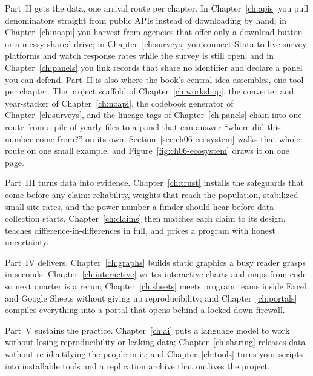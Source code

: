 \documentclass[
    a4paper,
    fontsize=10pt,
    twoside=true,
    numbers=noenddot,
]{kaobook}
\begin{document}
Part~II gets the data, one arrival route per chapter. In Chapter~\ref{ch:apis} you pull denominators straight from public APIs instead of downloading by hand; in Chapter~\ref{ch:noapi} you harvest from agencies that offer only a download button or a messy shared drive; in Chapter~\ref{ch:surveys} you connect Stata to live survey platforms and watch response rates while the survey is still open; and in Chapter~\ref{ch:panels} you link records that share no identifier and declare a panel you can defend. Part~II is also where the book's central idea assembles, one tool per chapter. The project scaffold of Chapter~\ref{ch:workshop}, the converter and year-stacker of Chapter~\ref{ch:noapi}, the codebook generator of Chapter~\ref{ch:surveys}, and the lineage tags of Chapter~\ref{ch:panels} chain into one route from a pile of yearly files to a panel that can answer \enquote{where did this number come from?} on its own. Section~\ref{sec:ch06-ecosystem} walks that whole route on one small example, and Figure~\ref{fig:ch06-ecosystem} draws it on one page.

Part~III turns data into evidence. Chapter~\ref{ch:trust} installs the safeguards that come before any claim: reliability, weights that reach the population, stabilized small-site rates, and the power number a funder should hear before data collection starts. Chapter~\ref{ch:claims} then matches each claim to its design, teaches difference-in-differences in full, and prices a program with honest uncertainty.

Part~IV delivers. Chapter~\ref{ch:graphs} builds static graphics a busy reader grasps in seconds; Chapter~\ref{ch:interactive} writes interactive charts and maps from code so next quarter is a rerun; Chapter~\ref{ch:sheets} meets program teams inside Excel and Google Sheets without giving up reproducibility; and Chapter~\ref{ch:portals} compiles everything into a portal that opens behind a locked-down firewall.

Part~V sustains the practice. Chapter~\ref{ch:ai} puts a language model to work without losing reproducibility or leaking data; Chapter~\ref{ch:sharing} releases data without re-identifying the people in it; and Chapter~\ref{ch:tools} turns your scripts into installable tools and a replication archive that outlives the project.
\end{document}
